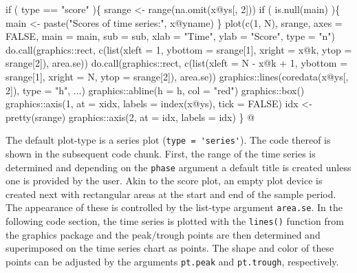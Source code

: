 \documentclass[a4paper]{article}
\begin{document}
\nwenddocs{}\endmoddef
if ( type == "score" )\{
    srange <- range(na.omit(x@ys[, 2]))
    if ( is.null(main) )\{
        main <- paste("Scores of time series:", x@yname)
    \}
    plot(c(1, N), srange, axes = FALSE,
         main = main,
         sub = sub,
         xlab = "Time", ylab = "Score", type = "n")
    do.call(graphics::rect, c(list(xleft = 1,
                                   ybottom = srange[1],
                                   xright = x@k,
                                   ytop = srange[2]),
                              area.se))
    do.call(graphics::rect, c(list(xleft = N - x@k + 1,
                                   ybottom = srange[1],
                                   xright = N,
                                   ytop = srange[2]),
                              area.se))
    graphics::lines(coredata(x@ys[, 2]), type = "h", ...)
    graphics::abline(h = h, col = "red")
    graphics::box()
    graphics::axis(1, at = xidx, labels = index(x@ys), tick = FALSE)
    idx <- pretty(srange)
    graphics::axis(2, at = idx, labels = idx)
\}
\nwendcode{}@

The default plot-type is a series plot (\verb?type = 'series'?). The code
thereof is shown in the subsequent code chunk. First, the range of the
time series is determined and depending on the \verb?phase? argument a
default title is created unless one is provided by the user. Akin to
the score plot, an empty plot device is created next with rectangular
areas at the start and end of the sample period. The appearance of
these is controlled by the list-type argument \verb?area.se?. In the
following code section, the time series is plotted with the
\verb?lines()? function from the graphics package and the peak/trough
points are then determined and superimposed on the time series chart
as points. The shape and color of these points can be adjusted by the
arguments \verb?pt.peak? and \verb?pt.trough?, respectively.
\end{document}
